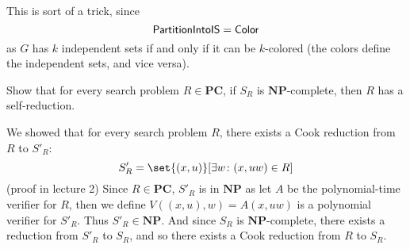 \documentclass[10pt]{article}
\def\Color{\mathsf{Color}}
\def\PC{\mathbf{PC}}
\def\NP{\mathbf{NP}}
\begin{document}
This is sort of a trick, since
\[ \partintois = \Color \]
as $G$ has $k$ independent sets if and only if it can be $k$-colored (the colors define the independent sets, and vice versa).

\begin{exercise*}

    Show that for every search problem $R\in\PC$, if $S_R$ is $\NP$-complete, then $R$ has a self-reduction.

\end{exercise*}

We showed that for every search problem $R$, there exists a Cook reduction from $R$ to $S'_R$:
\[ S'_R = \set{(x,u)}[\exists w\colon (x,uw)\in R] \]
(proof in lecture 2)
Since $R\in\PC$, $S'_R$ is in $\NP$ as let $A$ be the polynomial-time verifier for $R$, then we define $V((x,u),w)=A(x,uw)$ is a polynomial verifier for $S'_R$.
Thus $S'_R\in\NP$.
And since $S_R$ is $\NP$-complete, there exists a reduction from $S'_R$ to $S_R$, and so there exists a Cook reduction from $R$ to $S_R$.
\end{document}
